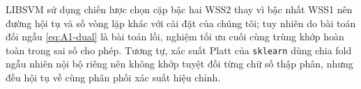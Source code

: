 \begin{remark}
LIBSVM sử dụng chiến lược chọn cặp bậc hai WSS2 \citep{fan2005working} thay vì bậc nhất WSS1 nên đường hội tụ và số vòng lặp khác với cài đặt của chúng tôi; tuy nhiên do bài toán đối ngẫu \eqref{eq:A1-dual} là bài toán lồi, nghiệm tối ưu cuối cùng trùng khớp hoàn toàn trong sai số cho phép. Tương tự, xác suất Platt của \texttt{sklearn} dùng chia fold ngẫu nhiên nội bộ riêng nên không khớp tuyệt đối từng chữ số thập phân, nhưng đều hội tụ về cùng phân phối xác suất hiệu chỉnh.
\end{remark}
